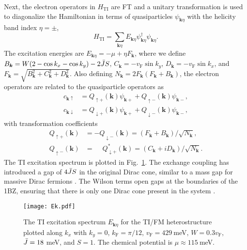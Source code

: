 \documentclass[aps, prb, twocolumn,amsmath,amssymb,floatfix]{revtex4-2}
\begin{document}
Next, the electron operators in $H_{\textrm{TI}}$ are FT and a unitary transformation is used to diagonalize the Hamiltonian in terms of quasiparticles $\psi_{\boldsymbol{k}\eta}$ with the helicity band index $\eta = \pm$,
\begin{equation}
     H_{\textrm{TI}} = \sum_{\boldsymbol{k} \eta} E_{\boldsymbol{k}\eta} \psi_{\boldsymbol{k}\eta}^\dagger \psi_{\boldsymbol{k}\eta}.
\end{equation}
The excitation energies are $E_{\boldsymbol{k}\eta} = -\mu + \eta F_{\boldsymbol{k}}$, where we define $B_{\boldsymbol{k}} = W(2-\cos k_x - \cos k_y) -2\Bar{J}S$, $C_{\boldsymbol{k}} = -v_{\textrm{F}} \sin k_y$, $D_{\boldsymbol{k}} = -v_{\textrm{F}} \sin k_x$, and $F_{\boldsymbol{k}} = \sqrt{B_{\boldsymbol{k}}^2 + C_{\boldsymbol{k}}^2 + D_{\boldsymbol{k}}^2}$.
Also defining $N_{\boldsymbol{k}} = 2F_{\boldsymbol{k}}(F_{\boldsymbol{k}} +B_{\boldsymbol{k}})$, the electron operators are related to the quasiparticle operators as
\begin{align}
    c_{\boldsymbol{k}\uparrow} &= Q_{\uparrow +}(\boldsymbol{k}) \psi_{\boldsymbol{k}+} + Q_{\uparrow -}(\boldsymbol{k})\psi_{\boldsymbol{k}-}, \\
    c_{\boldsymbol{k}\downarrow} &= Q_{\downarrow +}(\boldsymbol{k}) \psi_{\boldsymbol{k}+} + Q_{\downarrow -}(\boldsymbol{k})\psi_{\boldsymbol{k}-},
\end{align}
with transformation coefficients
\begin{align}
\label{eq:Qcoeff}
    Q_{\uparrow +}(\boldsymbol{k}) &= -Q_{\downarrow -}(\boldsymbol{k}) = (F_{\boldsymbol{k}} +B_{\boldsymbol{k}})/\sqrt{N_{\boldsymbol{k}}}, \\
    Q_{\uparrow -}(\boldsymbol{k}) &= \phantom{-}Q_{\downarrow +}^*(\boldsymbol{k}) = (C_{\boldsymbol{k}} +iD_{\boldsymbol{k}})/\sqrt{N_{\boldsymbol{k}}}. \label{eq:Qcoeff2}
\end{align}
The TI excitation spectrum is plotted in Fig.~\ref{fig:Ek}. The exchange coupling has introduced a gap of $4\Bar{J}S$ in the original Dirac cone, similar to a mass gap for massive Dirac fermions \cite{DiracMaterials}. The Wilson terms open gaps at the boundaries of the 1BZ, ensuring that there is only one Dirac cone present in the system \cite{WilsonZhou}. 


\begin{figure}
    \centering
    \texttt{[image: Ek.pdf]}
    \caption{The TI excitation spectrum $E_{\boldsymbol{k}\eta}$ for the TI/FM heterostructure plotted along $k_x$ with $k_y = 0$, $k_{\textrm{F}} = \pi/12$, $v_{\textrm{F}} = 429~$meV, $W=0.3v_{\textrm{F}}$, $\Bar{J} = 18~$meV, and $S=1$. The chemical potential is $\mu \approx 115~$meV.}
    \label{fig:Ek}
\end{figure}
\end{document}

